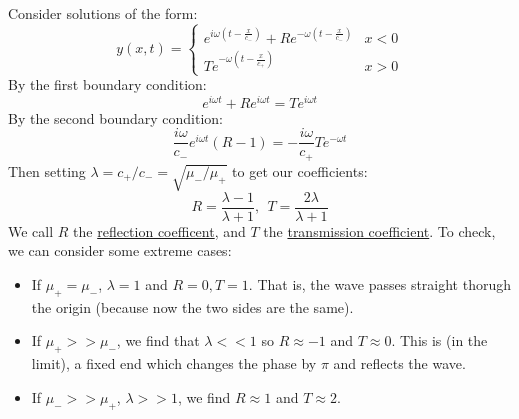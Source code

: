 \documentclass[../Main.tex]{subfiles}
\begin{document}
Consider solutions of the form:
\begin{equation*}
    y(x, t) =
    \begin{cases}
        e^{i\omega(t - \frac{x}{c_-})} + Re^{-\omega(t - \frac{x}{c_-})} & x < 0 \\
        Te^{-\omega (t - \frac{x}{c_+})} & x > 0
    \end{cases}
\end{equation*}
By the first boundary condition:
\begin{equation*}
    e^{i\omega t} + Re^{i\omega t} = Te^{i\omega t}
\end{equation*}
By the second boundary condition:
\begin{equation*}
    \frac{i\omega}{c_-} e^{i\omega t} (R - 1) = -\frac{i\omega}{c_+} Te^{-\omega t}
\end{equation*}
Then setting $\lambda = c_+ / c_- = \sqrt{\mu_- / \mu_+}$ to get our coefficients:
\begin{equation*}
    R = \frac{\lambda - 1}{\lambda + 1},~~T = \frac{2\lambda}{\lambda + 1}
\end{equation*}
We call $R$ the \underline{reflection coefficent}, and $T$ the \underline{transmission coefficient}.
To check, we can consider some extreme cases:
\begin{itemize}
    \item If $\mu_+ = \mu_-$, $\lambda = 1$ and $R = 0, T = 1$. That is, the wave passes straight thorugh the origin (because now the two sides are the same).
    \item If $\mu_+ >> \mu_-$, we find that $\lambda << 1$ so $R \approx -1$ and $T \approx 0$. This is (in the limit), a fixed end which changes the phase by $\pi$ and reflects the wave.
    \item If $\mu_- >> \mu_+$, $\lambda >> 1$, we find $R \approx 1$ and $T \approx 2$.
\end{itemize}
\end{document}
